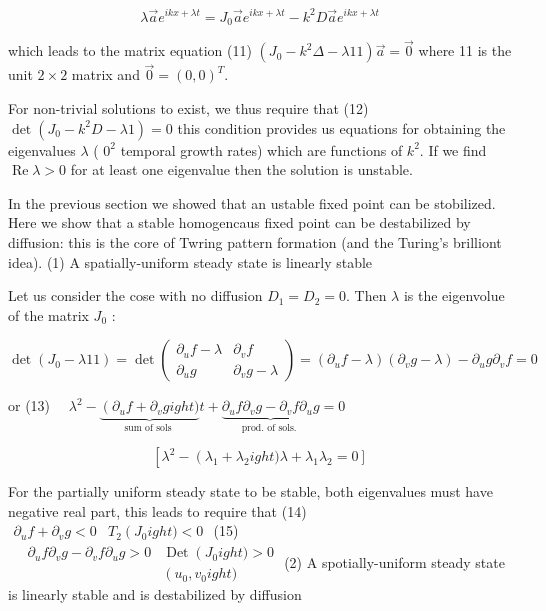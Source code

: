 $$ 
\lambda \vec{a} e^{i k x+\lambda t}=J_{0} \vec{a} e^{i k x+\lambda t}-k^{2} D \vec{a} e^{i k x+\lambda t}
$$ 

which leads to the matrix equation
(11) $\left(J_{0}-k^{2} \Delta-\lambda 11\right) \vec{a}=\overrightarrow{0}$
where 11 is the unit $2 \times 2$ matrix and $\overrightarrow{0}=(0,0)^{T}$.

For non-trivial solutions to exist, we thus require that
(12) $\operatorname{det}
\left(J_{0}-k^{2} D-\lambda 1\right)=0$
this condition provides us equations for obtaining the eigenvalues $\lambda$ ( $0^{2}$ temporal growth rates) which are functions of $k^{2}$.
If we find $\operatorname{Re} \lambda>0$ for at least one eigenvalue then the solution is unstable.

In the previous section we showed that an ustable fixed point can be stobilized. Here we show that a stable homogencaus fixed point can be destabilized by diffusion: this is the core of Twring pattern formation (and the Turing's brilliont idea).
(1) A spatially-uniform steady state is linearly stable

Let us consider the cose with no diffusion $D_{1}=D_{2}=0$.
Then $\lambda$ is the eigenvolue of the matrix $J_{0}$ :

$$ 
\operatorname{det}
\left(J_{0}-\lambda 11\right)=\operatorname{det}\left(\begin{array}{cc}
\partial_{u} f-\lambda & \partial_{v} f \\ 
\partial_{u} g & \partial_{v} g-\lambda
\end{array}\right)=\left(\partial_{u} f-\lambda\right)\left(\partial_{v} g-\lambda\right)-\partial_{u} g \partial_{v} f=0
$$ 

or
(13) $\quad \lambda^{2}-\underbrace{\left(\partial_{u} f+\partial_{v} g
ight)}_{\text {sum of sols }} t+\underbrace{\partial_{u} f \partial_{v} g-\partial_{v} f \partial_{u} g}_{\text {prod. of sols. }}=0$

$$ 
\left[\lambda^{2}-\left(\lambda_{1}+\lambda_{2}
ight) \lambda+\lambda_{1} \lambda_{2}=0\right]
$$ 

For the partially uniform steady state to be stable, both eigenvalues must have negative real part, this leads to require that
(14) $\begin{array}{ll}\partial_{u} f+\partial_{v} g<0 & T_{2}
\left(J_{0}
ight)<0
\end{array}$
(15) $\quad \begin{array}{ll}\partial_{u} f \partial_{v} g-\partial_{v} f \partial_{u} g>0 & \operatorname{Det}
\left(J_{0}
ight)>0 \\ & \left(u_{0}, v_{0}
ight)
\end{array}$
(2) A spotially-uniform steady state is linearly stable and is destabilized by diffusion

